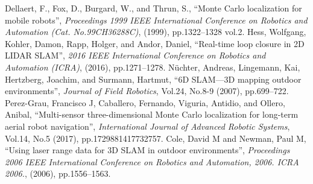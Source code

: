 \documentclass[a4jsme]{jsmepaper}
\begin{document}
{\small
\begin{thebibliography}{99}
%                                                                                                                                                                                                          
    Dellaert, F., Fox, D., Burgard, W., and Thrun, S.,
    ``Monte Carlo localization for mobile robots'',
    {\it Proceedings 1999 IEEE International Conference on Robotics and Automation (Cat. No.99CH36288C)},
    (1999), pp.1322--1328 vol.2.
%                                                                                                                                                                                                          
    Hess, Wolfgang, Kohler, Damon, Rapp, Holger, and Andor, Daniel,
    ``Real-time loop closure in 2D LIDAR SLAM'',
    {\it 2016 IEEE International Conference on Robotics and Automation (ICRA)},
    (2016), pp.1271--1278.
%                                                                                                                                                                                                          
    N{\"u}chter, Andreas, Lingemann, Kai, Hertzberg, Joachim, and Surmann, Hartmut,
    ``6D SLAM—3D mapping outdoor environments'',
    {\it Journal of Field Robotics},
    Vol.24, No.8-9 (2007), pp.699--722.
%                                                                                                                                                                                                          
    Perez-Grau, Francisco J, Caballero, Fernando, Viguria, Antidio, and Ollero, Anibal,
    ``Multi-sensor three-dimensional Monte Carlo localization for long-term aerial robot navigation'',
    {\it International Journal of Advanced Robotic Systems},
    Vol.14, No.5 (2017), pp.1729881417732757.
%                                                                                                                                                                                                          
    Cole, David M and Newman, Paul M,
    ``Using laser range data for 3D SLAM in outdoor environments'',
    {\it Proceedings 2006 IEEE International Conference on Robotics and Automation, 2006. ICRA 2006.},
    (2006), pp.1556--1563.


\end{thebibliography}}
\end{document}
